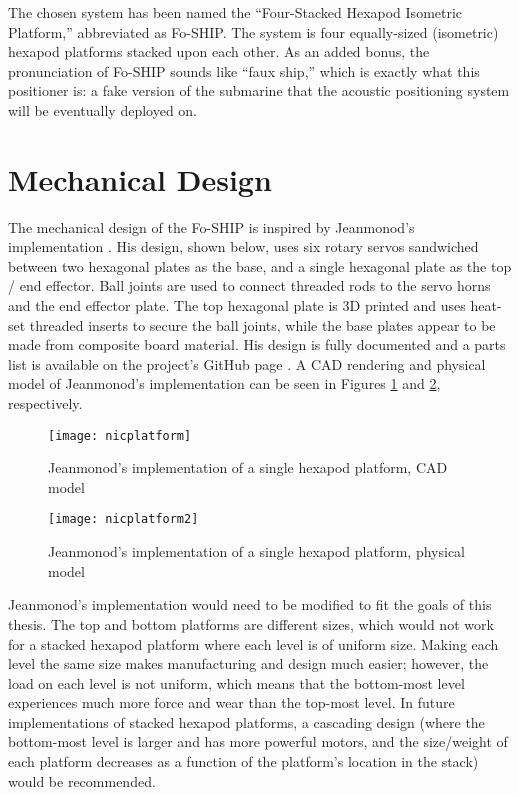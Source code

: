 \documentclass[11pt]{ucthesisCP}
\begin{document}
The chosen system has been named the “Four-Stacked Hexapod Isometric Platform,” abbreviated as Fo-SHIP. The system is four equally-sized (isometric) hexapod platforms stacked upon each other. As an added bonus, the pronunciation of Fo-SHIP sounds like “faux ship,” which is exactly what this positioner is: a fake version of the submarine that the acoustic positioning system will be eventually deployed on.

\section{Mechanical Design} \label{sec:2s2}
The mechanical design of the Fo-SHIP is inspired by Jeanmonod’s implementation \cite{nicdoc}. His design, shown below, uses six rotary servos sandwiched between two hexagonal plates as the base, and a single hexagonal plate as the top / end effector. Ball joints are used to connect threaded rods to the servo horns and the end effector plate. The top hexagonal plate is 3D printed and uses heat-set threaded inserts to secure the ball joints, while the base plates appear to be made from composite board material. His design is fully documented and a parts list is available on the project’s GitHub page \cite{nichub}. A CAD rendering and physical model of Jeanmonod's implementation can be seen in Figures \ref{fig:nicplatform} and \ref{fig:nicplatform2}, respectively. 

\begin{figure}[htbp]
	\centering
	\texttt{[image: nicplatform]}
	\caption{Jeanmonod’s implementation of a single hexapod platform, CAD model \cite{nichub}}
	\label{fig:nicplatform}
\end{figure}

\begin{figure}[htbp]
	\centering
	\texttt{[image: nicplatform2]}
	\caption{Jeanmonod’s implementation of a single hexapod platform, physical model \cite{nicdoc}}
	\label{fig:nicplatform2}
\end{figure}

Jeanmonod's implementation would need to be modified to fit the goals of this thesis. The top and bottom platforms are different sizes, which would not work for a stacked hexapod platform where each level is of uniform size. Making each level the same size makes manufacturing and design much easier; however, the load on each level is not uniform, which means that the bottom-most level experiences much more force and wear than the top-most level. In future implementations of stacked hexapod platforms, a cascading design (where the bottom-most level is larger and has more powerful motors, and the size/weight of each platform decreases as a function of the platform's location in the stack) would be recommended.
\end{document}
